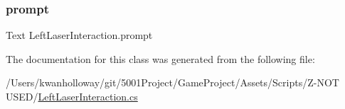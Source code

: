 \subsubsection{\texorpdfstring{prompt}{prompt}}
{\footnotesize\ttfamily Text Left\+Laser\+Interaction.\+prompt}



The documentation for this class was generated from the following file\+:\begin{DoxyCompactItemize}
\item 
/\+Users/kwanholloway/git/5001\+Project/\+Game\+Project/\+Assets/\+Scripts/\+Z-\/\+N\+O\+T U\+S\+E\+D/\hyperlink{_left_laser_interaction_8cs}{Left\+Laser\+Interaction.\+cs}\end{DoxyCompactItemize}

